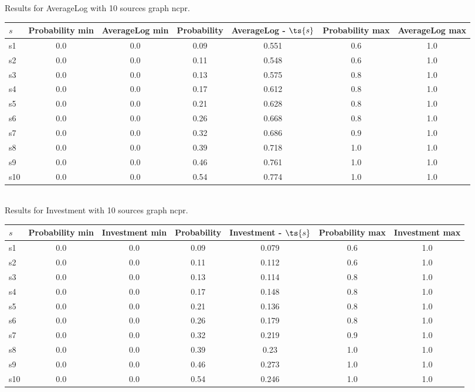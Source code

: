 \documentclass{article}
\begin{document}
\noindent Results for AverageLog with 10 sources graph ncpr.

\noindent\begin{tabular}{|l|c|c|c|c|c|c|}
\hline
$s$& Probability min & AverageLog min & Probability & AverageLog - $\ts{s}$ & Probability max & AverageLog max\\
\hline
s1 &0.0 & 0.0 & 0.09 & 0.551 & 0.6 & 1.0\\
\hline
s2 &0.0 & 0.0 & 0.11 & 0.548 & 0.6 & 1.0\\
\hline
s3 &0.0 & 0.0 & 0.13 & 0.575 & 0.8 & 1.0\\
\hline
s4 &0.0 & 0.0 & 0.17 & 0.612 & 0.8 & 1.0\\
\hline
s5 &0.0 & 0.0 & 0.21 & 0.628 & 0.8 & 1.0\\
\hline
s6 &0.0 & 0.0 & 0.26 & 0.668 & 0.8 & 1.0\\
\hline
s7 &0.0 & 0.0 & 0.32 & 0.686 & 0.9 & 1.0\\
\hline
s8 &0.0 & 0.0 & 0.39 & 0.718 & 1.0 & 1.0\\
\hline
s9 &0.0 & 0.0 & 0.46 & 0.761 & 1.0 & 1.0\\
\hline
s10 &0.0 & 0.0 & 0.54 & 0.774 & 1.0 & 1.0\\
\hline
\end{tabular}\\

\noindent Results for Investment with 10 sources graph ncpr.

\noindent\begin{tabular}{|l|c|c|c|c|c|c|}
\hline
$s$& Probability min & Investment min & Probability & Investment - $\ts{s}$ & Probability max & Investment max\\
\hline
s1 &0.0 & 0.0 & 0.09 & 0.079 & 0.6 & 1.0\\
\hline
s2 &0.0 & 0.0 & 0.11 & 0.112 & 0.6 & 1.0\\
\hline
s3 &0.0 & 0.0 & 0.13 & 0.114 & 0.8 & 1.0\\
\hline
s4 &0.0 & 0.0 & 0.17 & 0.148 & 0.8 & 1.0\\
\hline
s5 &0.0 & 0.0 & 0.21 & 0.136 & 0.8 & 1.0\\
\hline
s6 &0.0 & 0.0 & 0.26 & 0.179 & 0.8 & 1.0\\
\hline
s7 &0.0 & 0.0 & 0.32 & 0.219 & 0.9 & 1.0\\
\hline
s8 &0.0 & 0.0 & 0.39 & 0.23 & 1.0 & 1.0\\
\hline
s9 &0.0 & 0.0 & 0.46 & 0.273 & 1.0 & 1.0\\
\hline
s10 &0.0 & 0.0 & 0.54 & 0.246 & 1.0 & 1.0\\
\hline
\end{tabular}\\
\end{document}
